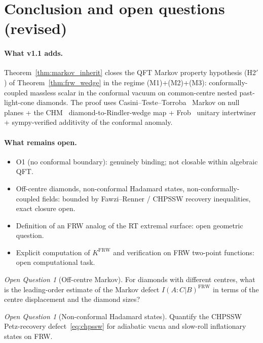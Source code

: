 \documentclass[11pt,a4paper]{article}
\theoremstyle{remark}
\newtheorem{question}[theorem]{Open Question}
\newcommand{\FRW}{{\mathrm{FRW}}}
\begin{document}
\section{Conclusion and open questions (revised)}
\label{sec:conclusion}

\paragraph{What v1.1 adds.}  Theorem~\ref{thm:markov_inherit} closes the
QFT Markov property hypothesis (H2$'$) of Theorem~\ref{thm:frw_wedge}
in the regime (M1)+(M2)+(M3): conformally-coupled massless scalar in
the conformal vacuum on common-centre nested past-light-cone diamonds.
The proof uses Casini--Teste--Torroba~\cite{CTT2017} Markov on null
planes + the CHM~\cite{CHM2011} diamond-to-Rindler-wedge map +
Frob~\cite{Frob2023} unitary intertwiner + sympy-verified additivity
of the conformal anomaly.

\paragraph{What remains open.}
\begin{itemize}
\item O1 (no conformal boundary): genuinely binding; not closable
  within algebraic QFT.
\item Off-centre diamonds, non-conformal Hadamard states,
  non-conformally-coupled fields: bounded by Fawzi--Renner / CHPSSW
  recovery inequalities, exact closure open.
\item Definition of an FRW analog of the RT extremal surface: open
  geometric question.
\item Explicit computation of $K^{\FRW}$ and verification on FRW
  two-point functions: open computational task.
\end{itemize}

\begin{question}[Off-centre Markov]
For diamonds with different centres, what is the leading-order
estimate of the Markov defect $I(A:C|B)^{\FRW}$ in terms of the centre
displacement and the diamond sizes?
\end{question}

\begin{question}[Non-conformal Hadamard states]
Quantify the CHPSSW Petz-recovery defect~\eqref{eq:chpssw} for adiabatic
vacua and slow-roll inflationary states on FRW.
\end{question}
\end{document}

